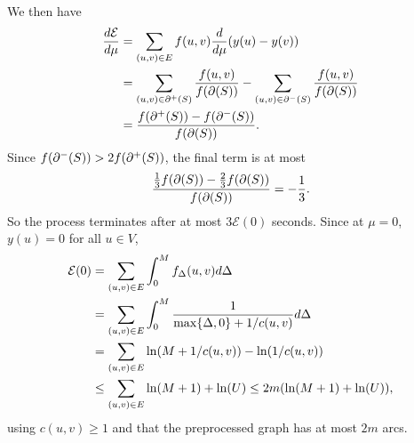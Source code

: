 \documentclass[12 pt]{article}
\begin{document}
We then have
\begin{align*}
  \frac{d\mathcal{E}}{d\mu} & = \sum_{(u, v) \in E} f(u, v)\frac{d}{d\mu}\paren{y(u) - y(v)}                                                    \\
                            & = \sum_{(u, v) \in \outcut{S}} \frac{f(u, v)}{f(\cut{S})} - \sum_{(u, v) \in \incut{S}}\frac{f(u, v)}{f(\cut{S})} \\
                            & = \frac{f(\outcut{S}) - f(\incut{S})}{f(\cut{S})}.
\end{align*}
Since $f(\incut{S}) > 2f(\outcut{S})$, the final term is at most
\[
  \frac{\frac{1}{3}f(\cut{S}) - \frac{2}{3}f(\cut{S})}{f(\cut{S})} = -\frac{1}{3}.
\]
So the process terminates after at most $3\mathcal{E}(0)$ seconds. Since at
$\mu = 0$, $y(u) = 0$ for all $u \in V$,
\begin{align*}
  \mathcal{E}(0) & = \sum_{(u, v) \in E} \int_0^M f_\Delta(u, v) d\Delta                            \\
                 & = \sum_{(u, v) \in E} \int_0^M \frac{1}{\max\Set{\Delta, 0} + 1/c(u, v)} d\Delta \\
                 & = \sum_{(u, v) \in E} \ln(M + 1/c(u, v)) - \ln(1/c(u, v))                        \\
                 & \leq \sum_{(u, v) \in E} \ln(M + 1) + \ln(U) \leq 2m(\ln(M + 1) + \ln(U)),
\end{align*}
using $c(u, v) \geq 1$ and that the preprocessed graph has at most $2m$ arcs.
\end{document}

